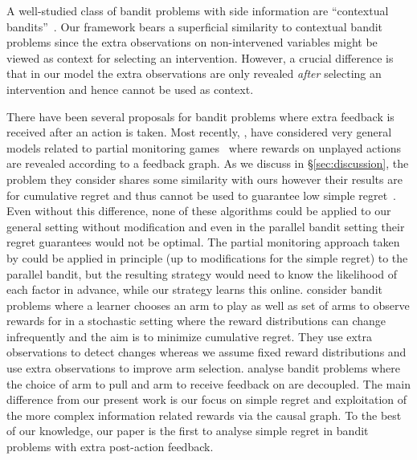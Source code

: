 A well-studied class of bandit problems with side information are ``contextual bandits''~\cite{Langford2008,Agarwal2014}. Our framework bears a superficial similarity to contextual bandit problems since the extra observations on non-intervened variables might be viewed as context for selecting an intervention. 
However, a crucial difference is that in our model the extra observations are only revealed \emph{after} selecting an intervention and hence cannot be used as context. 

There have been several proposals for bandit problems where extra feedback is received after an action is taken.
Most recently, \citet{Alon2015}, \citet{Kocak2014} have considered very general models related to partial monitoring games~\citep{Bartok2014} where rewards on unplayed actions are revealed according to a feedback graph. As we discuss in \S\ref{sec:discussion}, the problem they consider shares some similarity with ours however their results are for cumulative regret and thus cannot be used to guarantee low simple regret~\citep{Bubeck2009a}. Even without this difference, none
of these algorithms could be applied to our general setting without modification and even in the parallel bandit setting their regret guarantees would not be optimal.
The partial monitoring approach taken by \cite{wu2015online}
could be applied in principle (up to modifications for the simple regret) to the parallel bandit, but the resulting strategy would need to know the likelihood 
of each factor in advance, while our strategy learns this online.
\citet{Yu2009} consider bandit problems where a learner chooses an arm to play as well as set of arms to observe rewards for in a stochastic setting where the reward distributions can change infrequently and the aim is to minimize cumulative regret.
They use extra observations to detect changes whereas we assume fixed reward distributions and use extra observations to improve arm selection. 
\citet{Avner2012} analyse bandit problems where the choice of arm to pull and arm to receive feedback on are decoupled. 
The main difference from our present work is our focus on simple regret and exploitation of the more complex information related rewards via the causal graph.
To the best of our knowledge, our paper is the first to analyse simple regret in bandit problems with extra post-action feedback.



